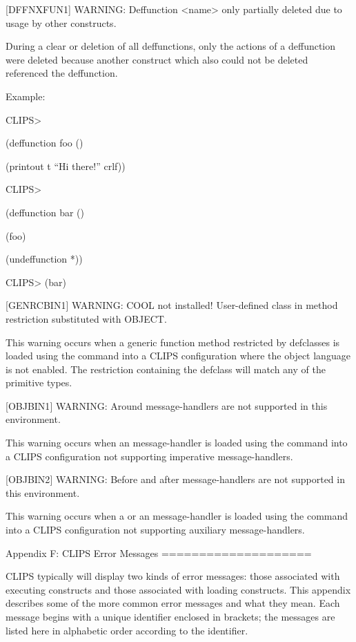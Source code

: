 \documentclass[letterpaper,10pt,english]{sphinxmanual}
\begin{document}
{[}DFFNXFUN1{]} WARNING: Deffunction \textless{}name\textgreater{} only partially deleted due to
usage by other constructs.

During a clear or deletion of all deffunctions, only the actions of a
deffunction were deleted because another construct which also could not
be deleted referenced the deffunction.

Example:

CLIPS\textgreater{}

(deffunction foo ()

(printout t “Hi there!” crlf))

CLIPS\textgreater{}

(deffunction bar ()

(foo)

(undeffunction *))

CLIPS\textgreater{} (bar)

{[}GENRCBIN1{]} WARNING: COOL not installed! User-defined class in method
restriction substituted with OBJECT.

This warning occurs when a generic function method restricted by
defclasses is loaded using the  command into a CLIPS
configuration where the object language is not enabled. The restriction
containing the defclass will match any of the primitive types.

{[}OBJBIN1{]} WARNING: Around message-handlers are not supported in this
environment.

This warning occurs when an  message-handler is loaded using
the  command into a CLIPS configuration not supporting
imperative message-handlers.

{[}OBJBIN2{]} WARNING: Before and after message-handlers are not supported
in this environment.

This warning occurs when a  or an  message-handler is
loaded using the  command into a CLIPS configuration not
supporting auxiliary message-handlers.

Appendix F:
CLIPS Error Messages
====================

CLIPS typically will display two kinds of error messages: those
associated with executing constructs and those associated with loading
constructs. This appendix describes some of the more common error
messages and what they mean. Each message begins with a unique
identifier enclosed in brackets; the messages are listed here in
alphabetic order according to the identifier.
\end{document}
